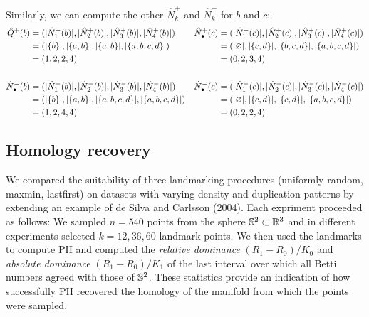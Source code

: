 \documentclass{article}
\begin{document}
\begin{example}
Similarly, we can compute the other $\hat{N}_k^+$ and $\hat{N}_k^-$ for $b$ and $c$:
\begin{align*}
    \hat{Q}^+ (b) &= (\lvert \hat{N}^+_1(b)\rvert, \lvert \hat{N}^+_2(b)\rvert, \lvert \hat{N}^+_3(b)\rvert, \lvert \hat{N}^+_4(b)\rvert) &
    \hat{N}_\bullet^+ (c) &= (\lvert \hat{N}^+_1(c)\rvert, \lvert \hat{N}^+_2(c)\rvert, \lvert \hat{N}^+_3(c)\rvert, \lvert \hat{N}^+_4(c)\rvert) \\
        &= (\lvert \{b\}\rvert, \lvert \{a, b\}\rvert, \lvert \{a, b\}\rvert, \lvert \{a, b, c, d\}\rvert) &
        &= (\lvert \varnothing\rvert, \lvert \{c, d\}\rvert, \lvert \{b, c, d\}\rvert, \lvert \{a, b, c, d\}\rvert) \\
        &= (1, 2, 2, 4) &
        &= (0, 2, 3, 4) \\
        \\
    \hat{N}_\bullet^- (b) &= (\lvert \hat{N}^-_1(b)\rvert, \lvert \hat{N}^-_2(b)\rvert, \lvert \hat{N}^-_3(b)\rvert, \lvert \hat{N}^-_4(b)\rvert) &
    \hat{N}_\bullet^- (c) &= (\lvert \hat{N}^-_1(c)\rvert, \lvert \hat{N}^-_2(c)\rvert, \lvert \hat{N}^-_3(c)\rvert, \lvert \hat{N}^-_4(c)\rvert) \\
        &= (\lvert \{b\}\rvert, \lvert \{a, b\}\rvert, \lvert \{a, b, c, d\}\rvert, \lvert \{a, b, c, d\}\rvert) &
        &= (\lvert \varnothing\rvert, \lvert \{c, d\}\rvert, \lvert \{c, d\}\rvert, \lvert \{a, b, c, d\}\rvert) \\
        &= (1, 2, 4, 4) &&= (0, 2, 2, 4)
\end{align*}
\end{example}

\hypertarget{homology-recovery}{%
\subsection{Homology recovery}\label{homology-recovery}}

We compared the suitability of three landmarking procedures (uniformly
random, maxmin, lastfirst) on datasets with varying density and
duplication patterns by extending an example of de Silva and Carlsson
(2004). Each expriment proceeded as follows: We sampled \(n=540\) points
from the sphere \(\mathbb{S}^2\subset\mathbb{R}^3\) and in different experiments
selected \(k=12,36,60\) landmark points. We then used the landmarks to
compute PH and computed the \emph{relative dominance}
\((R_1 - R_0) / K_0\) and \emph{absolute dominance}
\((R_1 - R_0) / K_1\) of the last interval over which all Betti numbers
agreed with those of \(\mathbb{S}^2\). These statistics provide an indication
of how successfully PH recovered the homology of the manifold from which
the points were sampled.
\end{document}
